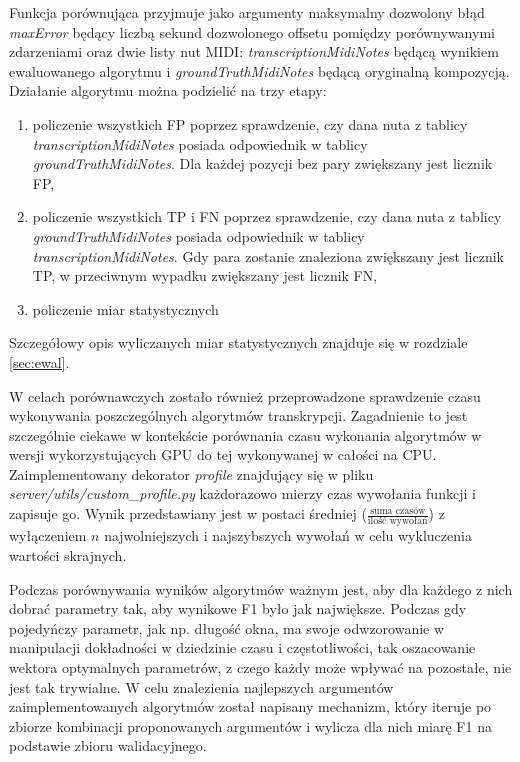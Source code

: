 \documentclass[12pt,a4paper,twoside]{mwart}
\begin{document}
Funkcja porównująca przyjmuje jako argumenty maksymalny dozwolony błąd \textit{maxError} będący liczbą sekund dozwolonego offsetu pomiędzy porównywanymi zdarzeniami oraz dwie listy nut MIDI: \textit{transcriptionMidiNotes} będącą wynikiem ewaluowanego algorytmu i \textit{groundTruthMidiNotes} będącą oryginalną kompozycją. Działanie algorytmu można podzielić na trzy etapy:
\begin{enumerate}
  \item policzenie wszystkich FP poprzez sprawdzenie, czy dana nuta z tablicy \textit{transcriptionMidiNotes} posiada odpowiednik w tablicy \textit{groundTruthMidiNotes}. Dla każdej pozycji bez pary zwiększany jest licznik FP,
  \item policzenie wszystkich TP i FN poprzez sprawdzenie, czy dana nuta z tablicy \textit{groundTruthMidiNotes} posiada odpowiednik w tablicy \textit{transcriptionMidiNotes}. Gdy para zostanie znaleziona zwiększany jest licznik TP, w przeciwnym wypadku zwiększany jest licznik FN,
  \item policzenie miar statystycznych
\end{enumerate}
Szczegółowy opis wyliczanych miar statystycznych znajduje się w rozdziale \ref{sec:ewal}.

W celach porównawczych zostało również przeprowadzone sprawdzenie czasu wykonywania poszczególnych algorytmów transkrypcji. Zagadnienie to jest szczególnie ciekawe w kontekście porównania czasu wykonania algorytmów w wersji wykorzystujących GPU do tej wykonywanej w całości na CPU. Zaimplementowany dekorator \textit{profile} znajdujący się w pliku \textit{server/utils/custom\_profile.py} każdorazowo mierzy czas wywołania funkcji i zapisuje go. Wynik przedstawiany jest w postaci średniej ($\frac{\textrm{suma czasów}}{\textrm{ilość wywołań}}$) z wyłączeniem $n$ najwolniejszych i najszybszych wywołań w celu wykluczenia wartości skrajnych.

Podczas porównywania wyników algorytmów ważnym jest, aby dla każdego z nich dobrać parametry tak, aby wynikowe F1 było jak największe. Podczas gdy pojedyńczy parametr, jak np. długość okna, ma swoje odwzorowanie w manipulacji dokładności w dziedzinie czasu i częstotliwości, tak oszacowanie wektora optymalnych parametrów, z czego każdy może wpływać na pozostałe, nie jest tak trywialne. W celu znalezienia najlepszych argumentów zaimplementowanych algorytmów został napisany mechanizm, który iteruje po zbiorze kombinacji proponowanych argumentów i wylicza dla nich miarę F1 na podstawie zbioru walidacyjnego. 
\end{document}
